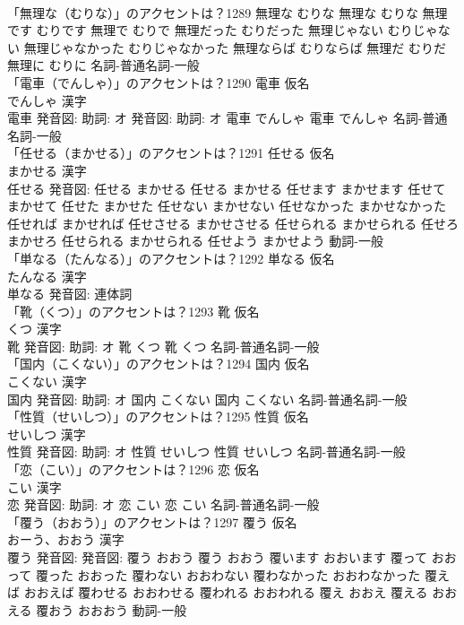 \documentclass[8pt]{extreport}
\begin{document}
\begin{CJK}{UTF8}{min}
\\	「無理な（むりな）」のアクセントは？1289		無理な むりな		無理な むりな 無理です むりです 無理で むりで 無理だった むりだった 無理じゃない むりじゃない 無理じゃなかった むりじゃなかった 無理ならば むりならば 無理だ むりだ 無理に むりに				名詞-普通名詞-一般 
\\	「電車（でんしゃ）」のアクセントは？1290	電車 仮名　
\\	でんしゃ 漢字　
\\	電車 発音図: 助詞: オ 発音図: 助詞: オ	電車 でんしゃ		電車 でんしゃ				名詞-普通名詞-一般 
\\	「任せる（まかせる）」のアクセントは？1291	任せる 仮名　
\\	まかせる 漢字　
\\	任せる 発音図:	任せる まかせる		任せる まかせる 任せます まかせます 任せて まかせて 任せた まかせた 任せない まかせない 任せなかった まかせなかった 任せれば まかせれば 任せさせる まかせさせる 任せられる まかせられる 任せろ まかせろ 任せられる まかせられる 任せよう まかせよう				動詞-一般 
\\	「単なる（たんなる）」のアクセントは？1292	単なる 仮名　
\\	たんなる 漢字　
\\	単なる 発音図:							連体詞 
\\	「靴（くつ）」のアクセントは？1293	靴 仮名　
\\	くつ 漢字　
\\	靴 発音図: 助詞: オ	靴 くつ		靴 くつ				名詞-普通名詞-一般 
\\	「国内（こくない）」のアクセントは？1294	国内 仮名　
\\	こくない 漢字　
\\	国内 発音図: 助詞: オ	国内 こくない		国内 こくない				名詞-普通名詞-一般 
\\	「性質（せいしつ）」のアクセントは？1295	性質 仮名　
\\	せいしつ 漢字　
\\	性質 発音図: 助詞: オ	性質 せいしつ		性質 せいしつ				名詞-普通名詞-一般 
\\	「恋（こい）」のアクセントは？1296	恋 仮名　
\\	こい 漢字　
\\	恋 発音図: 助詞: オ	恋 こい		恋 こい				名詞-普通名詞-一般 
\\	「覆う（おおう）」のアクセントは？1297	覆う 仮名　
\\	おーう、おおう 漢字　
\\	覆う 発音図: 発音図:	覆う おおう		覆う おおう 覆います おおいます 覆って おおって 覆った おおった 覆わない おおわない 覆わなかった おおわなかった 覆えば おおえば 覆わせる おおわせる 覆われる おおわれる 覆え おおえ 覆える おおえる 覆おう おおおう				動詞-一般 

\end{CJK}
\end{document}
